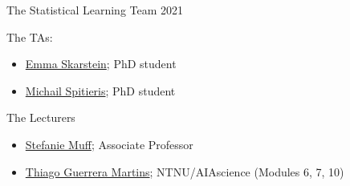 \documentclass[10pt,ignorenonframetext,]{beamer}
\providecommand{\tightlist}{%
  \setlength{\itemsep}{0pt}\setlength{\parskip}{0pt}}
\begin{document}
\begin{frame}{The Statistical Learning Team 2021}
\protect\hypertarget{the-statistical-learning-team-2021}{}

\begin{block}{The TAs:}

\begin{itemize}
\tightlist
\item
  \href{https://www.ntnu.no/ansatte/emma.s.skarstein}{Emma Skarstein};
  PhD student
\item
  \href{https://www.ntnu.no/ansatte/michail.spitieris}{Michail
  Spitieris}; PhD student
\end{itemize}

\end{block}

\begin{block}{The Lecturers}

\begin{itemize}
\tightlist
\item
  \href{https://www.ntnu.edu/employees/stefanie.muff}{Stefanie Muff};
  Associate Professor
\item
  \href{https://www.ntnu.no/ansatte/thiago.guerrera}{Thiago Guerrera
  Martins}; NTNU/AIAscience (Modules 6, 7, 10)
\end{itemize}

\end{block}

\end{frame}
\end{document}

